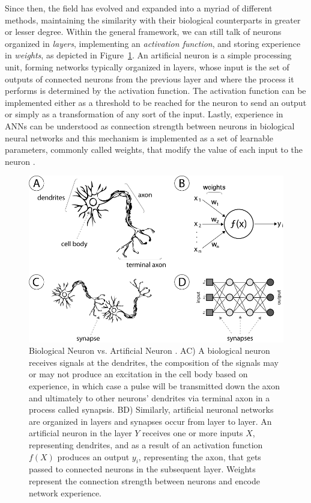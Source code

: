 Since then, the field has evolved and expanded into a myriad of different methods, maintaining the similarity with their biological counterparts in greater or lesser degree.
Within the general framework, we can still talk of neurons organized in \emph{layers}, implementing an \emph{activation function}, and storing experience in \emph{weights}, as depicted in Figure~\ref{fig:sec:theory:neurons}.
An artificial neuron is a simple processing unit, forming networks typically organized in layers, whose input is the set of outputs of connected neurons from the previous layer and where the process it performs is determined by the activation function.
The activation function can be implemented either as a threshold to be reached for the neuron to send an output or simply as a transformation of any sort of the input.
Lastly, experience in ANNs can be understood as connection strength between neurons in biological neural networks and this mechanism is implemented as a set of learnable parameters, commonly called weights, that modify the value of each input to the neuron \cite{Hinton1990}.

\begin{figure}[t]
  \includegraphics[width=\textwidth]{gfx/neurons}
  \caption{
    Biological Neuron vs. Artificial Neuron \cite{Honorio2013}.
    AC) A biological neuron receives signals at the dendrites, the composition of the signals may or may not produce an excitation in the cell body based on experience, in which case a pulse will be transmitted down the axon and ultimately to other neurons' dendrites via terminal axon in a process called synapsis.
    BD) Similarly, artificial neuronal networks are organized in layers and synapses occur from layer to layer.
    An artificial neuron in the layer $Y$ receives one or more inputs $X$, representing dendrites, and as a result of an activation function $f(X)$ produces an output $y_i$, representing the axon, that gets passed to connected neurons in the subsequent layer.
    Weights represent the connection strength between neurons and encode network experience.
  }
  \label{fig:sec:theory:neurons}
\end{figure}

